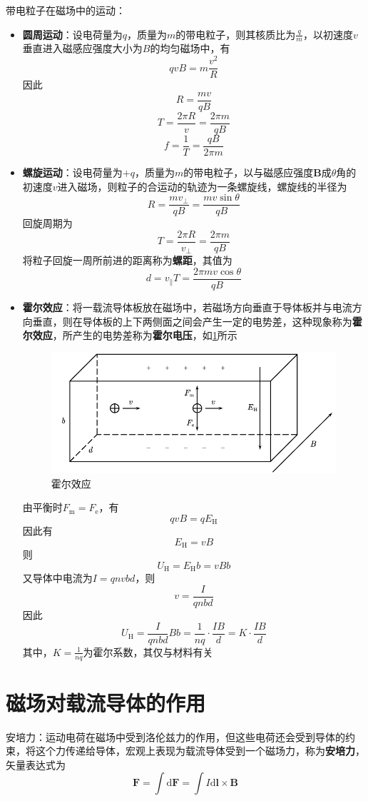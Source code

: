 \documentclass[12pt, a4paper, twoside]{ctexbook}
\begin{document}
{\sonti 带电粒子在磁场中的运动}：
\begin{itemize}
    \item \textbf{圆周运动}：设电荷量为$q$，质量为$m$的带电粒子，则其核质比为$\frac{q}{m}$，以初速度$v$垂直进入磁感应强度大小为$B$的均匀磁场中，有
    $$
    qvB=m\frac{v^2}{R}
    $$
    因此
    $$
    R=\frac{mv}{qB}
    $$
    $$
    T=\frac{2\pi R}{v}=\frac{2\pi m}{qB}
    $$
    $$
    f=\frac{1}{T}=\frac{qB}{2\pi m}
    $$
    \item \textbf{螺旋运动}：设电荷量为$+q$，质量为$m$的带电粒子，以与磁感应强度$\boldsymbol{B}$成$\theta$角的初速度$v$进入磁场，则粒子的合运动的轨迹为一条螺旋线，螺旋线的半径为
    $$
    R=\frac{mv_\bot}{qB}=\frac{mv\sin\theta}{qB}
    $$
    回旋周期为
    $$
    T=\frac{2\pi R}{v_\bot}=\frac{2\pi m}{qB}
    $$
    将粒子回旋一周所前进的距离称为\textbf{螺距}，其值为
    $$
    d=v_\parallel T=\frac{2\pi mv\cos\theta}{qB}
    $$
    \item \textbf{霍尔效应}：将一载流导体板放在磁场中，若磁场方向垂直于导体板并与电流方向垂直，则在导体板的上下两侧面之间会产生一定的电势差，这种现象称为\textbf{霍尔效应}，所产生的电势差称为\textbf{霍尔电压}，如\textcolor{blue}{\cref{fig:霍尔效应}}所示
    \begin{figure}[H]
        \centerline{\includegraphics[scale=0.8]{霍尔效应}}
        \caption{霍尔效应}
        \label{fig:霍尔效应}
    \end{figure}
    由平衡时$F_\mathrm{m}=F_\mathrm{e}$，有
    $$
    qvB=qE_\mathrm{H}
    $$
    因此有
    $$
    E_\mathrm{H}=vB
    $$
    则
    $$
    U_\mathrm{H}=E_\mathrm{H}b=vBb
    $$
    又导体中电流为$I=qnvbd$，则
    $$
    v=\frac{I}{qnbd}
    $$
    因此
    $$
    U_\mathrm{H}=\frac{I}{qnbd}Bb=\frac{1}{nq}\cdot\frac{IB}{d}=K\cdot\frac{IB}{d}
    $$
    其中，$K=\frac{1}{nq}$为霍尔系数，其仅与材料有关
\end{itemize}
\section{磁场对载流导体的作用}
{\sonti 安培力}：运动电荷在磁场中受到洛伦兹力的作用，但这些电荷还会受到导体的约束，将这个力传递给导体，宏观上表现为载流导体受到一个磁场力，称为\textbf{安培力}，矢量表达式为
$$
\boldsymbol{F}=\int\mathrm{d}\boldsymbol{F}=\int I\mathrm{d}\boldsymbol{l}\times\boldsymbol{B}
$$
\end{document}

